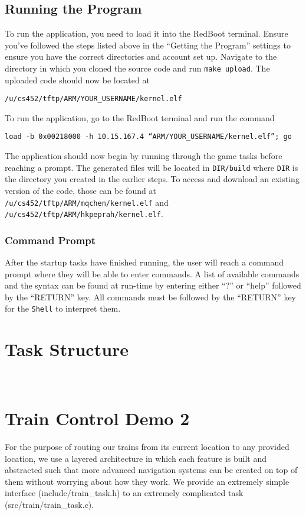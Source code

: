 \documentclass[12pt]{article}
\begin{document}
\subsection{Running the Program}
To run the application, you need to load it into the RedBoot terminal.  Ensure you've followed the steps listed above in the ``Getting the Program'' settings to ensure you have the correct directories and account set up.  Navigate to the directory in which you cloned the source code and run \texttt{make upload}.  The uploaded code should now be located at
\begin{center}
  \texttt{/u/cs452/tftp/ARM/YOUR\_USERNAME/kernel.elf}
\end{center}
To run the application, go to the RedBoot terminal and run the command
\begin{center}
  \texttt{load -b 0x00218000 -h 10.15.167.4 ``ARM/YOUR\_USERNAME/kernel.elf''; go}
\end{center}
The application should now begin by running through the game tasks before reaching a prompt.  The generated files will be located in \texttt{DIR/build} where \texttt{DIR} is the directory you created in the earlier steps.  To access and download an existing version of the code, those can be found at \texttt{/u/cs452/tftp/ARM/mqchen/kernel.elf} and \texttt{/u/cs452/tftp/ARM/hkpeprah/kernel.elf}.
\\
\subsubsection{Command Prompt}
After the startup tasks have finished running, the user will reach a command prompt where they will be able to enter commands.  A list of available commands and the syntax can be found at run-time by entering either ``?'' or ``help'' followed by the ``RETURN'' key.  All commands must be followed by the ``RETURN'' key for the {\tt Shell} to interpret them.
\\[2\baselineskip]
\section{Task Structure}
\\[2\baselineskip]
\section{Train Control Demo 2}
For the purpose of routing our trains from its current location to any provided location, we use a layered architecture
in which each feature is built and abstracted such that more advanced navigation systems can be created on top of them
without worrying about how they work. We provide an extremely simple interface (include/train\_task.h) to an extremely
complicated task (src/train/train\_task.c).
\end{document}
